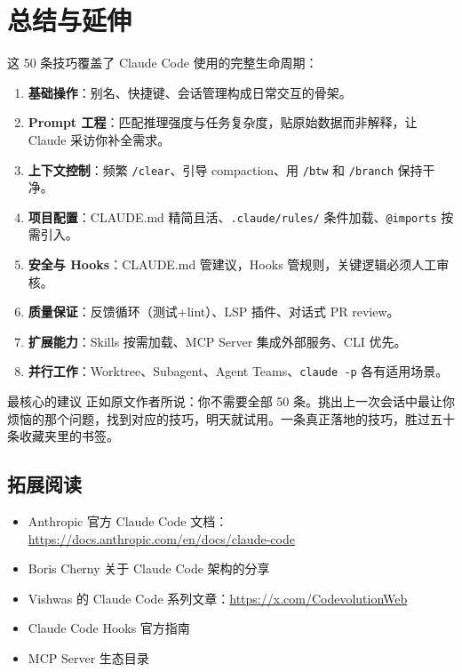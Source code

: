 \section{总结与延伸}

这 50 条技巧覆盖了 Claude Code 使用的完整生命周期：

\begin{enumerate}
  \item \textbf{基础操作}：别名、快捷键、会话管理构成日常交互的骨架。
  \item \textbf{Prompt 工程}：匹配推理强度与任务复杂度，贴原始数据而非解释，让 Claude 采访你补全需求。
  \item \textbf{上下文控制}：频繁 \texttt{/clear}、引导 compaction、用 \texttt{/btw} 和 \texttt{/branch} 保持干净。
  \item \textbf{项目配置}：CLAUDE.md 精简且活、\texttt{.claude/rules/} 条件加载、\texttt{@imports} 按需引入。
  \item \textbf{安全与 Hooks}：CLAUDE.md 管建议，Hooks 管规则，关键逻辑必须人工审核。
  \item \textbf{质量保证}：反馈循环（测试+lint）、LSP 插件、对话式 PR review。
  \item \textbf{扩展能力}：Skills 按需加载、MCP Server 集成外部服务、CLI 优先。
  \item \textbf{并行工作}：Worktree、Subagent、Agent Teams、\texttt{claude -p} 各有适用场景。
\end{enumerate}

\begin{importantbox}{最核心的建议}
正如原文作者所说：你不需要全部 50 条。挑出上一次会话中最让你烦恼的那个问题，找到对应的技巧，明天就试用。一条真正落地的技巧，胜过五十条收藏夹里的书签。
\end{importantbox}

\subsection{拓展阅读}

\begin{itemize}
  \item Anthropic 官方 Claude Code 文档：\url{https://docs.anthropic.com/en/docs/claude-code}
  \item Boris Cherny 关于 Claude Code 架构的分享
  \item Vishwas 的 Claude Code 系列文章：\url{https://x.com/CodevolutionWeb}
  \item Claude Code Hooks 官方指南
  \item MCP Server 生态目录
\end{itemize}



